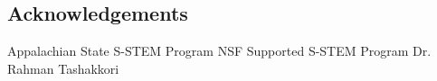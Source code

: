 \documentclass[a0,portrait]{a0poster}
\begin{document}
\begin{multicols}{2}

\section*{Acknowledgements}

Appalachian State S-STEM Program\newline
NSF Supported S-STEM Program\newline
Dr. Rahman Tashakkori


\end{multicols}
\end{document}
